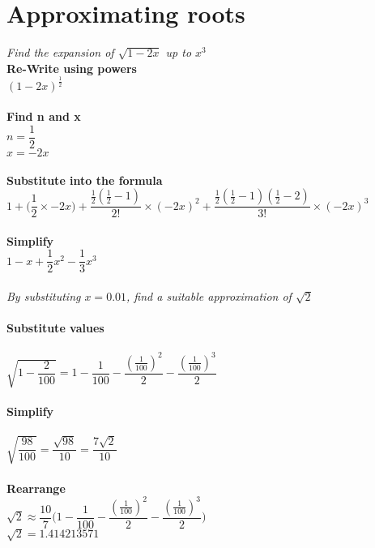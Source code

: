 \documentclass{article}[18pt]
\begin{document}
\section{Approximating roots}
\textit{Find the expansion of $\sqrt{1-2x}$ up to $x^3$}\\
\textbf{Re-Write using powers}\\
$(1-2x)^{\frac{1}{2}}$\\
\\
\textbf{Find n and x}\\
$n=\dfrac{1}{2}$\\
$x=-2x$\\
\\
\textbf{Substitute into the formula}\\
$1+\Bigg(\dfrac{1}{2}\times-2x\Bigg)+\dfrac{\frac{1}{2}(\frac{1}{2}-1)}{2!}\times(-2x)^2+\dfrac{\frac{1}{2}(\frac{1}{2}-1)(\frac{1}{2}-2)}{3!}\times(-2x)^3$\\
\\
\textbf{Simplify}\\
$1-x+\dfrac{1}{2}x^2-\dfrac{1}{3}x^3$\\
\\
\textit{By substituting $x=0.01$, find a suitable approximation of $\sqrt{2}$}\\
\\
\textbf{Substitute values}\\
\\
$\sqrt{1-\dfrac{2}{100}}=1-\dfrac{1}{100}-\dfrac{(\frac{1}{100})^2}{2}-\dfrac{(\frac{1}{100})^3}{2}$\\
\\
\textbf{Simplify}\\
\\
$\sqrt{\dfrac{98}{100}}=\dfrac{\sqrt{98}}{10}=\dfrac{7\sqrt{2}}{10}$\\
\\
\textbf{Rearrange}\\
$\sqrt{2}\approx\dfrac{10}{7}\Bigg(1-\dfrac{1}{100}-\dfrac{(\frac{1}{100})^2}{2}-\dfrac{(\frac{1}{100})^3}{2}\Bigg)$\\
$\sqrt{2}=1.414213571$
\end{document}
